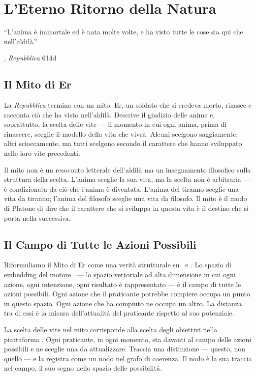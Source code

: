 \chapter{L'Eterno Ritorno della Natura}

\epigraph{``L'anima \`e immortale ed \`e nata molte volte, e ha visto tutte
le cose sia qui che nell'aldil\`a.''}{\textcite{plato1997complete}, \emph{Repubblica} 614d}

\section{Il Mito di Er}

La \emph{Repubblica} termina con un mito. Er, un soldato che si credeva
morto, rinasce e racconta ci\`o che ha visto nell'aldil\`a. Descrive il
giudizio delle anime e, soprattutto, la scelta delle vite --- il momento
in cui ogni anima, prima di rinascere, sceglie il modello della vita che
vivr\`a. Alcuni scelgono saggiamente, altri scioccamente, ma tutti
scelgono secondo il carattere che hanno sviluppato nelle loro vite
precedenti.

Il mito non \`e un resoconto letterale dell'aldil\`a ma un insegnamento
filosofico sulla struttura della scelta. L'anima sceglie la sua vita, ma
la scelta non \`e arbitraria --- \`e condizionata da ci\`o che l'anima
\`e diventata. L'anima del tiranno sceglie una vita da tiranno; l'anima
del filosofo sceglie una vita da filosofo. Il mito \`e il modo di Platone
di dire che il carattere che si sviluppa in questa vita \`e il destino
che si porta nella successiva.

\section{Il Campo di Tutte le Azioni Possibili}

Riformuliamo il Mito di Er come una verit\`a strutturale su \praxis\ e
\physis. Lo spazio di embedding del motore \physis\ --- lo spazio
vettoriale ad alta dimensione in cui ogni azione, ogni intenzione, ogni
risultato \`e rappresentato --- \`e il campo di tutte le azioni possibili.
Ogni azione che il praticante potrebbe compiere occupa un punto in questo
spazio. Ogni azione che ha compiuto ne occupa un altro. La distanza tra
di essi \`e la misura dell'attualit\`a del praticante rispetto al suo
potenziale.

La scelta delle vite nel mito corrisponde alla scelta degli obiettivi
nella piattaforma \praxis. Ogni praticante, in ogni momento, sta davanti
al campo delle azioni possibili e ne sceglie una da attualizzare. Traccia
una distinzione --- questo, non quello --- e la registra come un nodo nel
grafo di coerenza. Il nodo \`e la sua traccia nel campo, il suo segno
nello spazio delle possibilit\`a.

